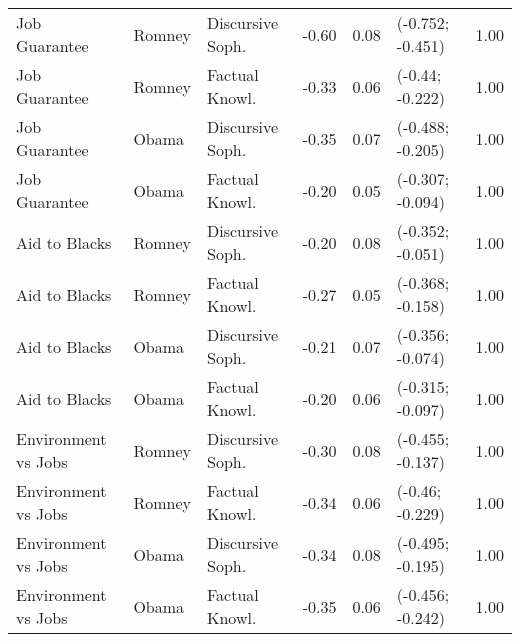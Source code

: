 \begin{table}[ht]
\begin{tabular}{lllrrlr}
  Job Guarantee & Romney & Discursive Soph. & -0.60 & 0.08 & (-0.752; -0.451) & 1.00 \\ 
  Job Guarantee & Romney & Factual Knowl. & -0.33 & 0.06 & (-0.44; -0.222) & 1.00 \\ 
  Job Guarantee & Obama & Discursive Soph. & -0.35 & 0.07 & (-0.488; -0.205) & 1.00 \\ 
  Job Guarantee & Obama & Factual Knowl. & -0.20 & 0.05 & (-0.307; -0.094) & 1.00 \\ 
  Aid to Blacks & Romney & Discursive Soph. & -0.20 & 0.08 & (-0.352; -0.051) & 1.00 \\ 
  Aid to Blacks & Romney & Factual Knowl. & -0.27 & 0.05 & (-0.368; -0.158) & 1.00 \\ 
  Aid to Blacks & Obama & Discursive Soph. & -0.21 & 0.07 & (-0.356; -0.074) & 1.00 \\ 
  Aid to Blacks & Obama & Factual Knowl. & -0.20 & 0.06 & (-0.315; -0.097) & 1.00 \\ 
  Environment vs Jobs & Romney & Discursive Soph. & -0.30 & 0.08 & (-0.455; -0.137) & 1.00 \\ 
  Environment vs Jobs & Romney & Factual Knowl. & -0.34 & 0.06 & (-0.46; -0.229) & 1.00 \\ 
  Environment vs Jobs & Obama & Discursive Soph. & -0.34 & 0.08 & (-0.495; -0.195) & 1.00 \\ 
  Environment vs Jobs & Obama & Factual Knowl. & -0.35 & 0.06 & (-0.456; -0.242) & 1.00 \\ 
   \hline
\end{tabular}
\end{table}
